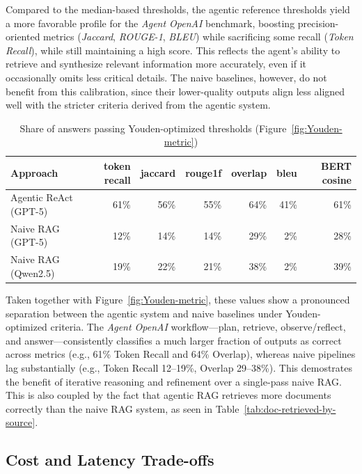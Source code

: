 Compared to the median-based thresholds, the agentic reference thresholds yield a more favorable profile for the \textit{Agent OpenAI} benchmark, boosting precision-oriented metrics (\textit{Jaccard}, \textit{ROUGE-1}, \textit{BLEU}) while sacrificing some recall (\textit{Token Recall}), while still maintaining a high score. This reflects the agent's ability to retrieve and synthesize relevant information more accurately, even if it occasionally omits less critical details. The naive baselines, however, do not benefit from this calibration, since their lower-quality outputs align less aligned well with the stricter criteria derived from the agentic system.

\begin{table}[htbp]
    \centering
    \begin{tabular}{l r r r r r r}
        \hline
        Approach & token recall & jaccard & rouge1f & overlap & bleu & \gls{BERT} cosine \\
        \hline
        Agentic ReAct (\gls{GPT}-5) & 61\% & 56\% & 55\% & 64\% & 41\% & 61\% \\
        Naive \gls{RAG} (\gls{GPT}-5) & 12\% & 14\% & 14\% & 29\% & 2\% & 28\% \\
        Naive \gls{RAG} (Qwen2.5) & 19\% & 22\% & 21\% & 38\% & 2\% & 39\% \\
        \hline
    \end{tabular}
    \caption{Share of answers passing Youden-optimized thresholds (Figure~\ref{fig:Youden-metric})}
    \label{tab:youden-metric-values}
\end{table}

Taken together with Figure~\ref{fig:Youden-metric}, these values show a pronounced separation between the agentic system and naive baselines under Youden-optimized criteria. The \textit{Agent OpenAI} workflow—plan, retrieve, observe/reflect, and answer—consistently classifies a much larger fraction of outputs as correct across metrics (e.g., 61\% Token Recall and 64\% Overlap), whereas naive pipelines lag substantially (e.g., Token Recall 12–19\%, Overlap 29–38\%). This demostrates the benefit of iterative reasoning and refinement over a single-pass naive RAG. This is also coupled by the fact that agentic RAG retrieves more documents correctly than the naive RAG system, as seen in Table~\ref{tab:doc-retrieved-by-source}.

\subsection{Cost and Latency Trade-offs}

